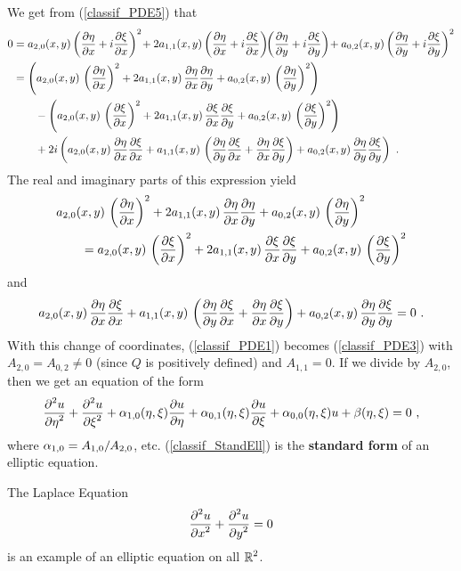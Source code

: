 We get from (\ref{classif_PDE5}) that
\begin{align*}
0 &= a_{2,0}(x,y) \left(\frac{\partial{\eta}}{\partial x}+i\frac{\partial{\xi}}{\partial x}\right)^2 \! +
2 a_{1,1}(x,y) \left(\frac{\partial{\eta}}{\partial x}+i\frac{\partial{\xi}}{\partial x}\right)
\!\! \left(\frac{\partial{\eta}}{\partial y}+i\frac{\partial{\xi}}{\partial y}\right) \!
+ a_{0,2}(x,y)\left(\frac{\partial{\eta}}{\partial y}+i\frac{\partial{\xi}}{\partial y}\right)^2 \\
&= \left( a_{2,0}(x,y)\,\left(\frac{\partial{\eta}}{\partial x}\right)^2
+ 2a_{1,1}(x,y)\, \frac{\partial{\eta}}{\partial x}\frac{\partial{\eta}}{\partial y}
+ a_{0,2}(x,y)\, \left(\frac{\partial{\eta}}{\partial y}\right)^2 \right) \\
&\qquad - \left( a_{2,0}(x,y)\,\left(\frac{\partial{\xi}}{\partial x}\right)^2
+ 2a_{1,1}(x,y)\, \frac{\partial{\xi}}{\partial x}\frac{\partial{\xi}}{\partial y}
+ a_{0,2}(x,y)\, \left(\frac{\partial{\xi}}{\partial y}\right)^2 \right) \\
&\qquad + 2i\left( a_{2,0}(x,y)\,\frac{\partial{\eta}}{\partial x}\frac{\partial{\xi}}{\partial x}
+ a_{1,1}(x,y)\, \left( \frac{\partial{\eta}}{\partial y}\frac{\partial{\xi}}{\partial x}
+\frac{\partial{\eta}}{\partial x}\frac{\partial{\xi}}{\partial y}\right)
+a_{0,2}(x,y)\,\frac{\partial{\eta}}{\partial y}\frac{\partial{\xi}}{\partial y}\right) \ .
\end{align*}
The real and imaginary parts of this expression yield
\begin{align*}
& a_{2,0}(x,y)\,\left(\frac{\partial{\eta}}{\partial x}\right)^2
+ 2a_{1,1}(x,y)\, \frac{\partial{\eta}}{\partial x}\frac{\partial{\eta}}{\partial y}
+ a_{0,2}(x,y)\, \left(\frac{\partial{\eta}}{\partial y}\right)^2 \\
& \qquad = a_{2,0}(x,y)\,\left(\frac{\partial{\xi}}{\partial x}\right)^2
+ 2a_{1,1}(x,y)\, \frac{\partial{\xi}}{\partial x}\frac{\partial{\xi}}{\partial y}
+ a_{0,2}(x,y)\, \left(\frac{\partial{\xi}}{\partial y}\right)^2
\end{align*}
and
\[
a_{2,0}(x,y)\,\frac{\partial{\eta}}{\partial x}\frac{\partial{\xi}}{\partial x}
+ a_{1,1}(x,y)\, \left( \frac{\partial{\eta}}{\partial y}\frac{\partial{\xi}}{\partial x}
+\frac{\partial{\eta}}{\partial x}\frac{\partial{\xi}}{\partial y}\right)
+a_{0,2}(x,y)\,\frac{\partial{\eta}}{\partial y}\frac{\partial{\xi}}{\partial y} = 0 \ .
\]
With this change of coordinates, (\ref{classif_PDE1}) becomes
(\ref{classif_PDE3}) with $A_{2,0} = A_{0,2} \neq 0$ (since $Q$ is
positively defined) and $A_{1,1} = 0$.  If we divide by $A_{2,0}$,
then we get an equation of the form
\begin{equation} \label{classif_StandEll}
\frac{\displaystyle \partial^{2}{u}} {\displaystyle \partial \eta^{2}} + \frac{\displaystyle \partial^{2}{u}} {\displaystyle \partial \xi^{2}}
+ \alpha_{1,0}(\eta,\xi) \frac{\partial{u}}{\partial \eta}
+ \alpha_{0,1}(\eta,\xi) \frac{\partial{u}}{\partial \xi} + \alpha_{0,0}(\eta,\xi)u +
\beta (\eta,\xi) = 0 \ , 
\end{equation}
where $\displaystyle \alpha_{1,0} = A_{1,0}/A_{2,0}$, etc.
(\ref{classif_StandEll}) is the
{\bfseries standard form} of an elliptic equation.

\begin{egg}
The Laplace Equation
\[
\frac{\displaystyle \partial^{2}{u}} {\displaystyle \partial x^{2}} + \frac{\displaystyle \partial^{2}{u}} {\displaystyle \partial y^{2}} = 0
\]
is an example of an elliptic equation on all $\displaystyle \mathbb{R}^2$.
\end{egg}

